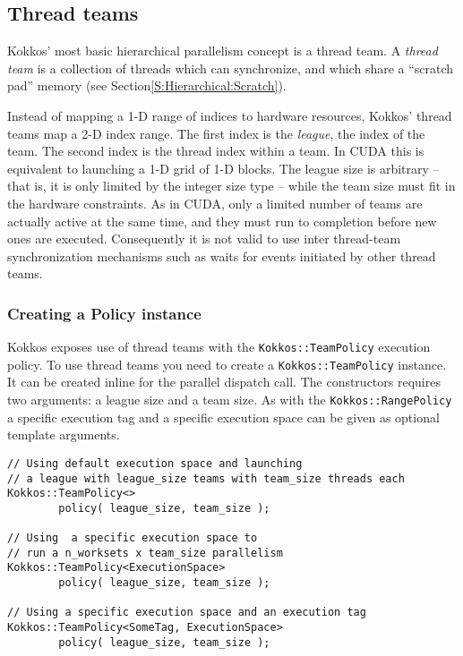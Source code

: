 \subsection{Thread teams}\label{S:Hierarchical:Teams}

Kokkos' most basic hierarchical parallelism concept is a thread team.
A \emph{thread team} is a collection of threads which can synchronize,
and which share a ``scratch pad'' memory
(see Section\ref {S:Hierarchical:Scratch}).

Instead of mapping a 1-D range of indices to hardware resources,
Kokkos' thread teams map a 2-D index range.
The first index is the \emph{league}, the index of the team.
The second index is the thread index within a team.
In CUDA this is equivalent to launching a 1-D grid of 1-D blocks.
The league size is arbitrary -- that is, it is only limited by the integer size type -- while the team size must fit in the hardware constraints.
As in CUDA, only a limited number of teams are actually active at the same time,
and they must run to completion before new ones are executed. 
Consequently it is not valid to use inter thread-team synchronization mechanisms
such as waits for events initiated by other thread teams. 

\subsubsection{Creating a Policy instance}\label{SS:Hierarchical:Teams:Policy}

Kokkos exposes use of thread teams with the \lstinline!Kokkos::TeamPolicy! execution policy.
To use thread teams you need to create a \lstinline|Kokkos::TeamPolicy| instance.
It can be created inline for the parallel dispatch call.
The constructors requires two arguments: a league size and a team size. 
As with the  \lstinline|Kokkos::RangePolicy| a specific execution tag and a specific execution space can be given as optional template arguments.
\begin{lstlisting}
// Using default execution space and launching 
// a league with league_size teams with team_size threads each
Kokkos::TeamPolicy<> 
        policy( league_size, team_size ); 

// Using  a specific execution space to 
// run a n_worksets x team_size parallelism
Kokkos::TeamPolicy<ExecutionSpace> 
        policy( league_size, team_size );

// Using a specific execution space and an execution tag 
Kokkos::TeamPolicy<SomeTag, ExecutionSpace> 
        policy( league_size, team_size ); 
\end{lstlisting}
 
